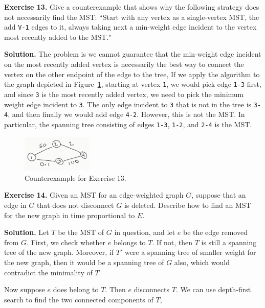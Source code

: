 \documentclass[12pt, a4paper]{article}
\newenvironment{ex}[2][Exercise]
{\par\medskip\noindent \textbf{#1 #2.}}
{\medskip}
\newenvironment{sol}[1][Solution]
{\par\medskip\noindent \textbf{#1.} }
{\medskip}
\begin{document}
	\begin{ex}{13}
		Give a counterexample that shows why the following strategy does not necessarily
		find the MST: ``Start with any vertex as a single-vertex MST, the add \texttt{V-1}
		edges to it, always taking next a min-weight edge incident to the vertex most
		recently added to the MST."
	\end{ex}
	\begin{sol}
		The problem is we cannot guarantee that the min-weight edge incident on
		the most recently added vertex is necessarily the best way to connect
		the vertex on the other endpoint of the edge to the tree,
		If we apply the algorithm to the graph depicted in Figure~\ref{fig:ex-13},
		starting at vertex \texttt{1}, we would pick edge \texttt{1-3} first,
		and since \texttt{3} is the most recently added vertex, we need to pick
		the minimum weight edge incident to \texttt{3}. The only edge incident to
		\texttt{3} that is not in the tree is \texttt{3-4}, and then finally we would
		add edge \texttt{4-2}. However, this is not the MST. In particular, the spanning
		tree consisting of edges \texttt{1-3}, \texttt{1-2}, and \texttt{2-4}
		is the MST.
		\begin{figure}
			\centering
			\includegraphics[width=0.3\textwidth]{exercise-13}
			\caption{Counterexample for Exercise 13.}
			\label{fig:ex-13}
		\end{figure}
	\end{sol}
	\begin{ex}{14}
		Given an MST for an edge-weighted graph $G$, suppose that an edge in $G$ that
		does not disconnect $G$ is deleted. Describe how to find an MST for the new graph
		in time proportional to $E$.
	\end{ex}
	\begin{sol}
		Let $T$ be the MST of $G$ in question, and let $e$ be the edge removed from $G$.
		First, we check whether $e$ belongs to $T$. If not, then $T$ is still a spanning
		tree of the new graph. Moreover, if $T'$ were a spanning tree of smaller
		weight for the new graph, then it would be a spanning tree of $G$ also,
		which would contradict the minimality of $T$.
		
		Now suppose $e$ does belong to $T$. Then $e$ disconnects $T$. We can use depth-first
		search to find the two connected components of $T$, 
	\end{sol}
	
	\pagebreak
	\printbibliography
\end{document}
